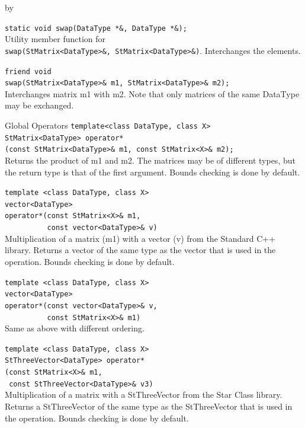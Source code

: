 \documentclass[twoside]{article}
\newcommand{\entrylabel}[1]{\mbox{\textbf{{#1}}}\hfil}%
\newenvironment{entry}
{\begin{list}{}%
    {\renewcommand{\makelabel}{\entrylabel}%
     \setlength{\labelwidth}{90pt}%
     \setlength{\leftmargin}{\labelwidth}
     \advance\leftmargin by \labelsep%
      }%
    }%
  {\end{list}}
\newcommand{\Entrylabel}[1]%
{\raisebox{0pt}[1ex][0pt]{\makebox[\labelwidth][l]%
    {\parbox[t]{\labelwidth}{\hspace{0pt}\textbf{{#1}}}}}}
\newenvironment{Entry}%
{\renewcommand{\entrylabel}{\Entrylabel}\begin{entry}}%
  {\end{entry}}
\begin{document}
\begin{Entry}
  \verb+static void swap(DataType *&, DataType *&);+\\
  Utility member function for \\
  \verb+swap(StMatrix<DataType>&, StMatrix<DataType>&)+.
  Interchanges the elements.
  
  \verb+friend void+\\
  \verb+swap(StMatrix<DataType>& m1, StMatrix<DataType>& m2);+\\
  Interchanges matrix m1 with m2.  Note that only matrices
  of the same DataType may be exchanged.

\item[Global Operators]
  \verb+template<class DataType, class X>+\\
  \verb+StMatrix<DataType> operator*+\\
  \verb+(const StMatrix<DataType>& m1, const StMatrix<X>& m2);+\\
  Returns the product of m1 and m2.  The matrices may be of different
  types, but the return type is that of the first argument.
  Bounds checking is done by default.
  
  \verb+template <class DataType, class X>+\\
  \verb+vector<DataType>+\\
  \verb+operator*(const StMatrix<X>& m1,+\\
  \verb+          const vector<DataType>& v)+\\
  Multiplication of a matrix (m1) with a vector (v) from the
  Standard C++ library.  Returns a vector of the
  same type as the vector that is used in the operation.
  Bounds checking is done by default.
  
  \verb+template <class DataType, class X>+\\
  \verb+vector<DataType>+\\
  \verb+operator*(const vector<DataType>& v,+\\
  \verb+          const StMatrix<X>& m1)+\\
  Same as above with different ordering.

  \verb+template <class DataType, class X>+\\
  \verb+StThreeVector<DataType> operator*+\\
  \verb+(const StMatrix<X>& m1,+\\
  \verb+ const StThreeVector<DataType>& v3)+\\
  Multiplication of a matrix with a StThreeVector from the
  Star Class library.  Returns a StThreeVector of the
  same type as the StThreeVector that is used in the operation.
  Bounds checking is done by default.


\end{Entry}
\end{document}
